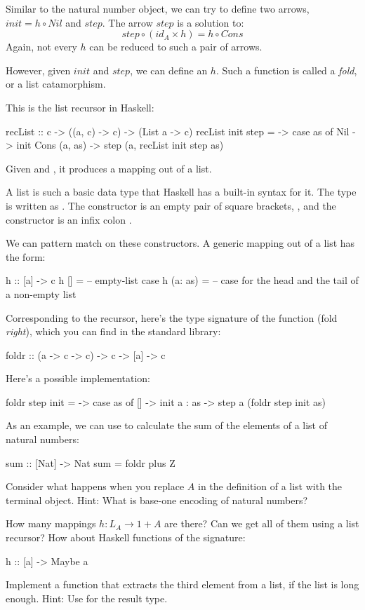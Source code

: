\documentclass[DaoFP]{subfiles}
\begin{document}
Similar to the natural number object, we can try to define two arrows, $init = h \circ Nil$ and $step$. The arrow $step$ is a solution to:
\[ step \circ (id_A \times h) = h \circ Cons \]
Again, not every $h$ can be reduced to such a pair of arrows.

However, given $init$ and $step$, we can define an $h$. Such a function is called a \emph{fold}, or a list catamorphism. 

This is the list recursor in Haskell:
\begin{haskell}
recList :: c -> ((a, c) -> c) -> (List a -> c)
recList init step = \as ->
  case as of 
    Nil          -> init
    Cons (a, as) -> step (a, recList init step as)
\end{haskell}
Given  and , it produces a mapping out of a list.

A list is such a basic data type that Haskell has a built-in syntax for it. The type  is written as \hask{[a]}. The  constructor is an empty pair of square brackets, \hask{[]}, and the  constructor is an infix colon \hask{:}.

We can pattern match on these constructors. A generic mapping out of a list has the form:
\begin{haskell}
h :: [a] -> c
h []      = -- empty-list case
h (a: as) = -- case for the head and the tail of a non-empty list
\end{haskell}

Corresponding to the recursor, here's the type signature of the function  (fold \emph{right}), which you can find in the standard library:
\begin{haskell}
foldr :: (a -> c -> c) -> c -> [a] -> c
\end{haskell}
Here's a possible implementation:
\begin{haskell}
foldr step init = \as ->
  case as of
    [] -> init
    a : as -> step a (foldr step init as)
\end{haskell}

As an example, we can use  to calculate the sum of the elements of a list of natural numbers:
\begin{haskell}
sum :: [Nat] -> Nat
sum = foldr plus Z
\end{haskell}


\begin{exercise}
Consider what happens when you replace $A$ in the definition of a list with the terminal object. Hint: What is base-one encoding of natural numbers?
\end{exercise}
\begin{exercise}
How many mappings $h \colon L_A \to 1 + A$ are there? Can we get all of them using a list recursor? How about Haskell functions of the signature:
\begin{haskell}
h :: [a] -> Maybe a
\end{haskell}
\end{exercise}
\begin{exercise}
Implement a function that extracts the third element from a list, if the list is long enough. Hint: Use  for the result type.
\end{exercise}
\end{document}

